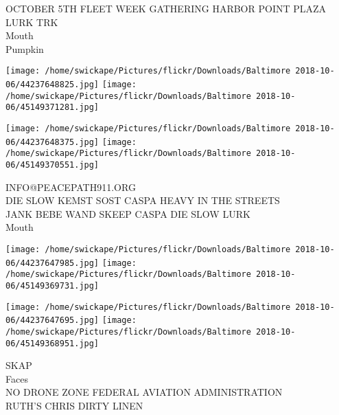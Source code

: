 \documentclass[10pt,letterpaper]{article}
\begin{document}
OCTOBER 5TH FLEET WEEK GATHERING HARBOR POINT PLAZA\\
LURK TRK\\
Mouth\\
Pumpkin\\
\pagebreak

\texttt{[image: /home/swickape/Pictures/flickr/Downloads/Baltimore 2018-10-06/44237648825.jpg]}
\texttt{[image: /home/swickape/Pictures/flickr/Downloads/Baltimore 2018-10-06/45149371281.jpg]}

\texttt{[image: /home/swickape/Pictures/flickr/Downloads/Baltimore 2018-10-06/44237648375.jpg]}
\texttt{[image: /home/swickape/Pictures/flickr/Downloads/Baltimore 2018-10-06/45149370551.jpg]}

INFO@PEACEPATH911.ORG\\
DIE SLOW KEMST SOST CASPA HEAVY IN THE STREETS\\
JANK BEBE WAND SKEEP CASPA DIE SLOW LURK\\
Mouth\\
\pagebreak

\texttt{[image: /home/swickape/Pictures/flickr/Downloads/Baltimore 2018-10-06/44237647985.jpg]}
\texttt{[image: /home/swickape/Pictures/flickr/Downloads/Baltimore 2018-10-06/45149369731.jpg]}

\texttt{[image: /home/swickape/Pictures/flickr/Downloads/Baltimore 2018-10-06/44237647695.jpg]}
\texttt{[image: /home/swickape/Pictures/flickr/Downloads/Baltimore 2018-10-06/45149368951.jpg]}

SKAP\\
Faces\\
NO DRONE ZONE FEDERAL AVIATION ADMINISTRATION\\
RUTH'S CHRIS DIRTY LINEN\\
\pagebreak
\end{document}
